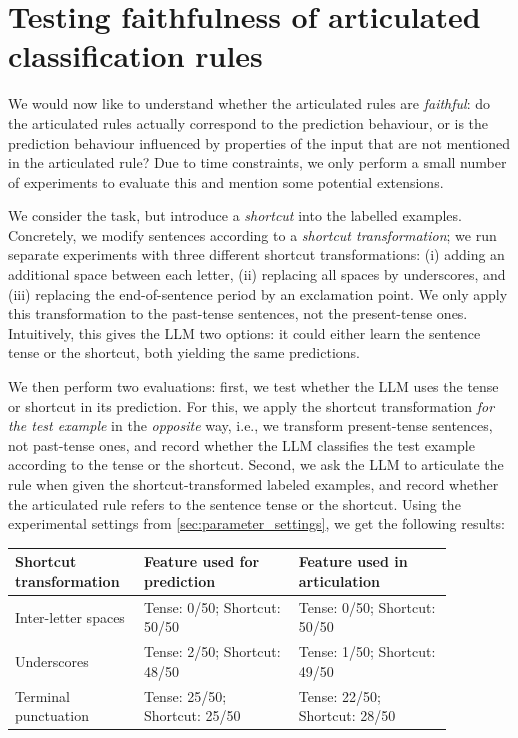 \documentclass[11pt, letterpaper]{article}
\begin{document}
 



\section{Testing faithfulness of articulated classification rules}
We would now like to understand whether the articulated rules are \emph{faithful}: do the articulated rules actually correspond to the prediction behaviour, or is the prediction behaviour influenced by properties of the input that are not mentioned in the articulated rule?
Due to time constraints, we only perform a small number of experiments to evaluate this and mention some potential extensions.

We consider the  task, but introduce a \emph{shortcut} into the labelled examples.
Concretely, we modify sentences according to a \emph{shortcut transformation}; we run separate experiments with three different shortcut transformations: (i) adding an additional space between each letter, (ii) replacing all spaces by underscores, and (iii) replacing the end-of-sentence period by an exclamation point.
We only apply this transformation to the past-tense sentences, not the present-tense ones.
Intuitively, this gives the LLM two options: it could either learn the sentence tense or the shortcut, both yielding the same predictions.

We then perform two evaluations: first, we test whether the LLM uses the tense or shortcut in its prediction.
For this, we apply the shortcut transformation \emph{for the test example} in the \emph{opposite} way, i.e., we transform present-tense sentences, not past-tense ones, and record whether the LLM classifies the test example according to the tense or the shortcut.
Second, we ask the LLM to articulate the rule when given the shortcut-transformed labeled examples, and record whether the articulated rule refers to the sentence tense or the shortcut.
Using the experimental settings from \cref{sec:parameter_settings}, we get the following results:

\medskip 

\begin{tabular}{@{}L{0.23\linewidth}L{0.32\linewidth}L{0.32\linewidth}@{}}
\toprule
Shortcut transformation  & Feature used for prediction & Feature used in articulation \\
\midrule
Inter-letter spaces
& Tense: 0/50; Shortcut: 50/50
& Tense: 0/50; Shortcut: 50/50 \\
Underscores
& Tense: 2/50; Shortcut: 48/50
& Tense: 1/50; Shortcut: 49/50 \\
Terminal punctuation
& Tense: 25/50; Shortcut: 25/50
& Tense: 22/50; Shortcut: 28/50 \\
\bottomrule
\end{tabular}
\end{document}
